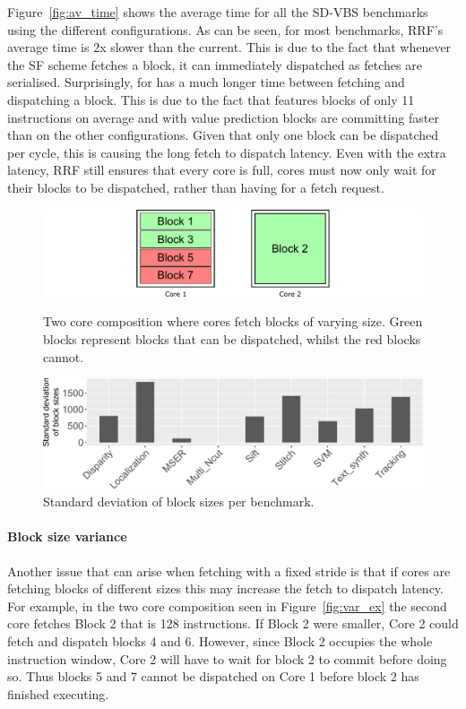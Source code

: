 Figure~\ref{fig:av_time} shows the average time for all the SD-VBS benchmarks using the different configurations.
As can be seen, for most benchmarks, RRF's average time is 2x slower than the current.
This is due to the fact that whenever the SF scheme fetches a block, it can immediately dispatched as fetches are serialised.
Surprisingly,  for \nfvp{} has a much longer time between fetching and dispatching a block.
This is due to the fact that  features blocks of only 11 instructions on average and with value prediction blocks are committing faster than on the other configurations.
Given that only one block can be dispatched per cycle, this is causing the long fetch to dispatch latency.
Even with the extra latency, RRF still ensures that every core is full, cores must now only wait for their blocks to be dispatched, rather than having for a fetch request.

\begin{figure}[t]
    \centering
    \includegraphics[width=1\textwidth]{chapter3/graphics/fetch_ex.pdf}
    \caption{Two core composition where cores fetch blocks of varying size. Green blocks represent blocks that can be dispatched, whilst the red blocks cannot.}
    \label{fig:var_ex}
    \centering
    \includegraphics[width=1\textwidth]{chapter3/graphics/variance.pdf}
    \caption{Standard deviation of block sizes per benchmark.}
    \label{fig:variance}
	\vspace{1em}
\end{figure}
\paragraph*{Block size variance}
Another issue that can arise when fetching with a fixed stride is that if cores are fetching blocks of different sizes this may increase the fetch to dispatch latency.
For example, in the two core composition seen in Figure~\ref{fig:var_ex} the second core fetches Block 2 that is 128 instructions.
If Block 2 were smaller, Core 2 could fetch and dispatch blocks 4 and 6.
However, since Block 2 occupies the whole instruction window, Core 2 will have to wait for block 2 to commit before doing so.
Thus blocks 5 and 7 cannot be dispatched on Core 1 before block 2 has finished executing.

